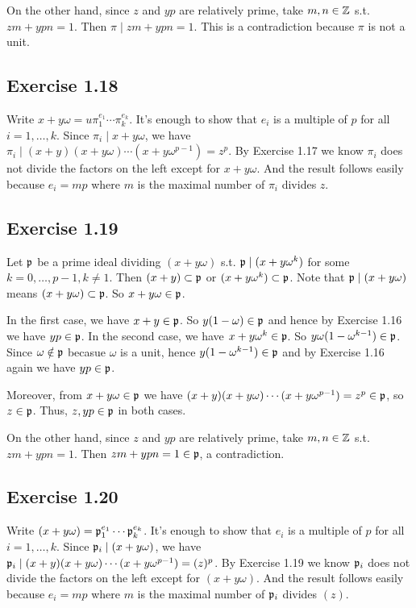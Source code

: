 \documentclass[../Marcus.tex]{subfiles}
\begin{document}
On the other hand, since $z$ and $yp$ are relatively prime, take $m,n\in\mathbb{Z}$ s.t. $zm+ypn=1$. Then $\pi\mid zm+ypn=1$. This is a contradiction because $\pi$ is not a unit.

\subsection*{Exercise 1.18}

Write $x+y\omega=u\pi_1^{e_1}\cdots\pi_k^{e_k}$. It's enough to show that $e_i$ is a multiple of $p$ for all $i=1,\ldots,k$. Since $\pi_i\mid x+y\omega$, we have $\pi_i\mid (x+y)(x+y\omega)\cdots(x+y\omega^{p-1})=z^p$. By Exercise 1.17 we know $\pi_i$ does not divide the factors on the left except for $x+y\omega$. And the result follows easily because $e_i=mp$ where $m$ is the maximal number of $\pi_i$ divides $z$.

\subsection*{Exercise 1.19}

Let $\mathfrak{p}$ be a prime ideal dividing $(x+y\omega)$ s.t. $\mathfrak{p}\mid (x+y\omega^k)$ for some $k=0,\ldots,p-1,k\neq 1$. Then $(x+y)\subset\mathfrak{p}$ or $(x+y\omega^k)\subset\mathfrak{p}$. Note that $\mathfrak{p}\mid (x+y\omega)$ means $(x+y\omega)\subset \mathfrak{p}$. So $x+y\omega\in\mathfrak{p}$.

In the first case, we have $x+y\in\mathfrak{p}$. So $y(1-\omega)\in\mathfrak{p}$ and hence by Exercise 1.16 we have $yp\in\mathfrak{p}$. In the second case, we have $x+y\omega^k\in\mathfrak{p}$. So $y\omega(1-\omega^{k-1})\in\mathfrak{p}$. Since $\omega\notin\mathfrak{p}$ becasue $\omega$ is a unit, hence $y(1-\omega^{k-1})\in\mathfrak{p}$ and by Exercise 1.16 again we have $yp\in\mathfrak{p}$.

Moreover, from $x+y\omega\in\mathfrak{p}$ we have $(x+y)(x+y\omega)\cdots(x+y\omega^{p-1})=z^p\in\mathfrak{p}$, so $z\in\mathfrak{p}$. Thus, $z,yp\in\mathfrak{p}$ in both cases.

On the other hand, since $z$ and $yp$ are relatively prime, take $m,n\in\mathbb{Z}$ s.t. $zm+ypn=1$. Then $zm+ypn=1\in\mathfrak{p}$, a contradiction.

\subsection*{Exercise 1.20}

Write $(x+y\omega)=\mathfrak{p}_1^{e_1}\cdots\mathfrak{p}_k^{e_k}$. It's enough to show that $e_i$ is a multiple of $p$ for all $i=1,\ldots,k$. Since $\mathfrak{p}_i\mid(x+y\omega)$, we have $\mathfrak{p}_i\mid(x+y)(x+y\omega)\cdots(x+y\omega^{p-1})=(z)^p$. By Exercise 1.19 we know $\mathfrak{p}_i$ does not divide the factors on the left except for $(x+y\omega)$. And the result follows easily because $e_i=mp$ where $m$ is the maximal number of $\mathfrak{p}_i$ divides $(z)$.
\end{document}

